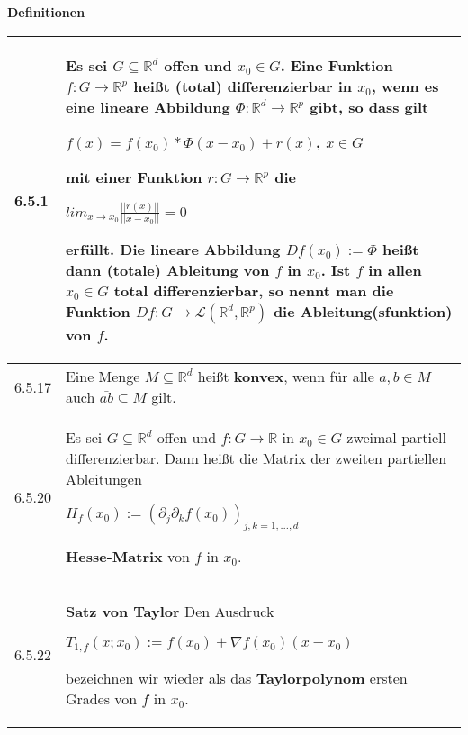     \noindent
    \textbf{Definitionen}
    \begin{table}[H]  
    \begin{tabularx}{\textwidth}{X m{16cm}}
        \toprule

        6.5.1 & Es sei $G \subseteq \mathbb{R}^d$ offen und $x_0 \in G$. Eine Funktion $f: G \rightarrow \mathbb{R}^p$ heißt
                \textbf{(total) differenzierbar} in $x_0$, wenn es eine lineare Abbildung $\Phi: \mathbb{R}^d \rightarrow \mathbb{R}^p$
                gibt, so dass gilt \hfill \break
                \centerline{$ f(x) = f(x_0) * \Phi(x-x_0) + r(x)$, $x \in G$}
                mit einer Funktion $r: G \rightarrow \mathbb{R}^p$ die \hfill \break
                \centerline{$ lim_{x \rightarrow x_0} \frac{||r(x)||}{||x-x_0||} = 0 $}
                erfüllt. \hfill \break
                Die lineare Abbildung $Df(x_0) := \Phi$ heißt dann \textbf{(totale) Ableitung} von $f$ in $x_0$. Ist $f$ in allen
                $x_0 \in G$ total differenzierbar, so nennt man die Funktion $Df: G \rightarrow \mathcal{L}(\mathbb{R}^d, \mathbb{R}^p)$
                die \textbf{Ableitung(sfunktion)} von $f$. \\
        \midrule
        6.5.17& Eine Menge $M \subseteq \mathbb{R}^d$ heißt \textbf{konvex}, wenn für alle $a,b \in M$ auch $\bar{ab} \subseteq M$ gilt. \\
        \midrule
        6.5.20& Es sei $G \subseteq \mathbb{R}^d$ offen und $f: G \rightarrow \mathbb{R}$ in $x_0 \in G$ zweimal partiell differenzierbar.
                Dann heißt die Matrix der zweiten partiellen Ableitungen \hfill \break
                \centerline{$ H_f(x_0) := (\partial_j \partial_k f(x_0))_{j,k = 1,\dots,d} $}
                \textbf{Hesse-Matrix} von $f$ in $x_0$. \\
        6.5.22& \textbf{Satz von Taylor} \hfill \break
                Den Ausdruck \hfill \break
                \centerline{$ T_{1,f}(x;x_0) := f(x_0) + \nabla f(x_0)(x-x_0) $}
                bezeichnen wir wieder als das \textbf{Taylorpolynom} ersten Grades von $f$ in $x_0$. \\

        \bottomrule

    \end{tabularx}
    \end{table}

